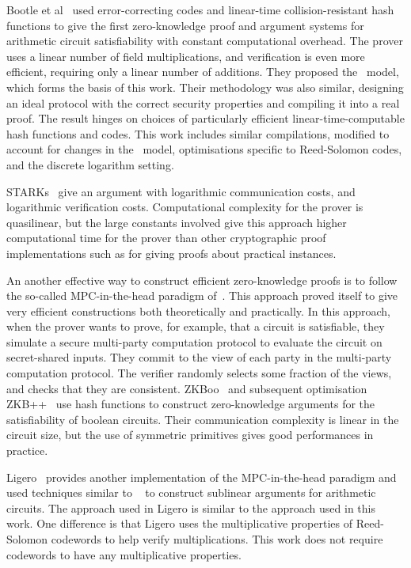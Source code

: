 Bootle et al~\cite{BootleCGGHJ17} used error-correcting codes and linear-time collision-resistant hash functions to give the first zero-knowledge proof and argument systems for arithmetic circuit satisfiability with constant computational overhead.  The prover uses a linear number of field multiplications, and verification is even more efficient, requiring only a linear number of additions. They proposed the \ILC\ model, which forms the basis of this work. Their methodology was also similar, designing an ideal protocol with the correct security properties and compiling it into a real proof. The result hinges on choices of particularly efficient linear-time-computable hash functions and codes. This work includes similar compilations, modified to account for changes in the \ILC\ model, optimisations specific to Reed-Solomon codes, and the discrete logarithm setting.

STARKs~\cite{Ben-SassonBHR18} give an argument with logarithmic communication costs, and logarithmic verification costs. Computational complexity for the prover is quasilinear, but the large constants involved give this approach higher computational time for the prover than other cryptographic proof implementations such as \cite{BunzBBPWM18,WahbyTSTW18} for giving proofs about practical instances.

An another effective way to construct efficient zero-knowledge proofs is to follow the so-called MPC-in-the-head paradigm of~\cite{IshaiKOS07}. This approach proved itself to give very efficient constructions both theoretically and practically. In this approach, when the prover wants to prove, for example, that a circuit is satisfiable, they simulate a secure multi-party computation protocol to evaluate the circuit on secret-shared inputs. They commit to the view of each party in the multi-party computation protocol. The verifier randomly selects some fraction of the views, and checks that they are consistent. ZKBoo~\cite{USENIX:GiaMadOrl16} and subsequent optimisation ZKB++~\cite{CCS:CDGORR17} use hash functions to construct zero-knowledge arguments for the satisfiability of boolean circuits. Their communication complexity is linear in the circuit size, but the use of symmetric primitives gives good performances in practice.

Ligero~\cite{CCS:AHIV17} provides another implementation of the MPC-in-the-head paradigm and used techniques similar to ~\cite{BootleCGGHJ17} to construct sublinear arguments for arithmetic circuits. The approach used in Ligero is similar to the approach used in this work. One difference is that Ligero uses the multiplicative properties of Reed-Solomon codewords to help verify multiplications. This work does not require codewords to have any multiplicative properties.

